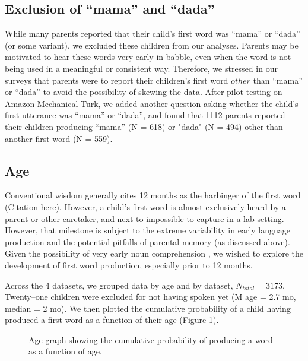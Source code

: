 \documentclass[10pt,letterpaper]{article}
\begin{document}
\subsection{Exclusion of ``mama'' and ``dada''}
While many parents reported that their child's first word was ``mama'' or ``dada'' (or some variant), we excluded these children from our analyses. Parents may be motivated to hear these words very early in babble, even when the word is not being used in a meaningful or consistent way. Therefore, we stressed in our surveys that parents were to report their children's first word $other$ than ``mama'' or ``dada'' to avoid the possibility of skewing the data. After pilot testing on Amazon Mechanical Turk, we added another question asking whether the child's first utterance was ``mama'' or ``dada'', and found that 1112 parents reported their children producing ``mama'' (N = 618) or "dada" (N = 494) other than another first word (N = 559).   

\subsection{Age} 

Conventional wisdom generally cites 12 months as the harbinger of the first word (Citation here). However, a child's first word is almost exclusively heard by a parent or other caretaker, and next to impossible to capture in a lab setting. However, that milestone is subject to the extreme variability in early language production  \cite{fenson1994} and the potential pitfalls of parental memory (as discussed above). Given the possibility of very early noun comprehension \cite{tincoff1999,tincoff2012,bergelson2012}, we wished to explore the development of first word production, especially prior to 12 months.

Across the 4 datasets, we grouped data by age and by dataset, $N_{total} = 3173$. Twenty--one children were excluded for not having spoken yet (M age  = 2.7 mo, median = 2 mo). We then plotted the cumulative probability of a child having produced a first word as a function of their age (Figure 1).

\begin{figure}[t]
	\caption{\label{fig:cdfs}  Age graph showing the cumulative probability of producing a word as a function of age.}
\end{figure}
\end{document}
